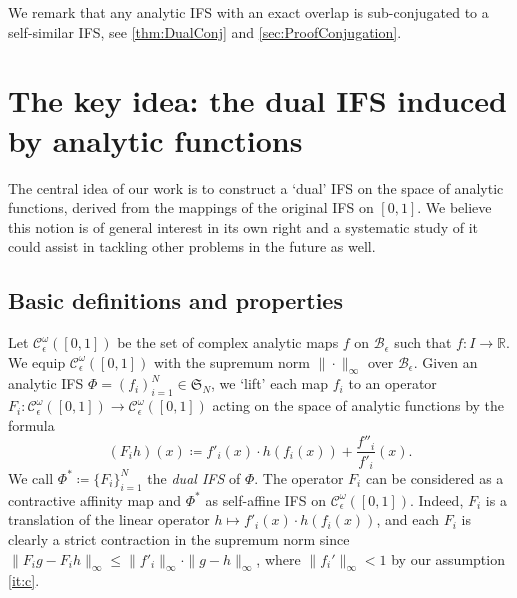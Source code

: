 \documentclass[12pt,]{article}
\def\cref#1{\ref{#1}}%
\theoremstyle{definition}
\theoremstyle{remark}
\newcommand{\0}{\mathbf{0}}
\begin{document}
We remark that any analytic IFS with an exact overlap is sub-conjugated to a self-similar IFS, see \cref{thm:DualConj} and \cref{sec:ProofConjugation}.




\section{The key idea: the dual IFS induced by analytic functions}\label{sec:DualIFSFull}
The central idea of our work is to construct a `dual' IFS on the space of analytic functions, derived from
the mappings of the original IFS on $[0,1]$.
We believe this notion is of general interest in its own right and a systematic study of it could
assist in tackling other problems in the future as well.

\subsection{Basic definitions and properties}

Let $\mathcal{C}_\epsilon^\omega([0,1])$ be the set of complex analytic maps $f$ on
$\mathcal{B}_{\epsilon}$ such that $f\colon I \to \mathbb{R}$. We equip $\mathcal{C}_\epsilon^\omega([0,1])$ with the supremum norm $\|\cdot\|_\infty$ over $\mathcal{B}_\epsilon$. Given an analytic IFS $\Phi=(f_i)_{i=1}^N\in\mathfrak{S}_N$, we `lift' each map $f_i$ to an operator $F_i:
\mathcal{C}^{\omega}_\epsilon([0,1]) \to \mathcal{C}_\epsilon^{\omega}([0,1])$ acting on the space of analytic
functions by the formula
\begin{equation}\label{eq:LiftedIFS}
	(F_i h)(x)\coloneqq f'_i(x)\cdot h(f_i(x)) + \frac{f''_i}{f'_i}(x).
\end{equation}
We call $\Phi^*\coloneqq\{F_i\}_{i=1}^N$ the \emph{dual IFS} of $\Phi$. The operator $F_i$ can be
considered as a contractive affinity map and $\Phi^*$ as self-affine IFS on $\mathcal{C}_\epsilon^\omega([0,1])$.
Indeed, $F_i$ is a translation of the linear operator $h\mapsto f'_i(x)\cdot h(f_i(x))$, and each $F_i$ is clearly a
strict contraction in the supremum norm since $\|F_ig-F_ih\|_{\infty}\leq \|f'_i\|_{\infty}\cdot\|g-h\|_{\infty}$, where $\|f_i'\|_\infty<1$ by our assumption \cref{it:c}.
\end{document}
